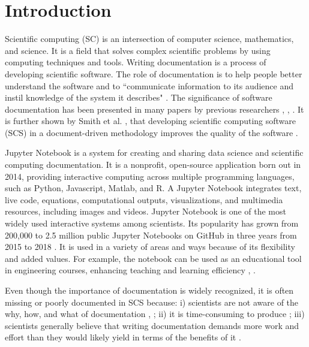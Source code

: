 \chapter{Introduction} \label{intro}
Scientific computing (SC) is an intersection of computer science, mathematics, 
and science. It is a field that solves complex scientific problems by using 
computing techniques and tools. Writing documentation is a process of 
developing scientific software. The role of documentation is to help 
people better understand the software and to ``communicate information to its 
audience and instil knowledge of the system it describes" 
\cite{forward2002software}. The significance of software documentation has 
been presented in many papers by previous researchers \cite{parnas2011precise}, 
\cite{chomal2014significance}, \cite{kipyegen2013importance}. It is further 
shown by Smith et al. \cite{SmithandKoothoor2016}, \cite{SmithandYu2007} that 
developing scientific computing software (SCS) in a document-driven methodology 
improves the quality of the software . 

Jupyter Notebook is a system for creating and sharing data science and 
scientific computing documentation. It is a nonprofit, open-source application 
born out in 2014, providing interactive computing across multiple programming 
languages, such as Python, Javascript, Matlab, and R. A Jupyter Notebook 
integrates text, live code, equations, computational outputs, visualizations, 
and multimedia resources, including images and videos. Jupyter Notebook is one 
of the most widely used interactive systems among scientists. Its popularity 
has grown from 200,000 to 2.5 million public Jupyter Notebooks on GitHub in 
three years from 2015 to 2018 \cite{Jeffrey2018}. It is used in a variety of 
areas and ways because of its flexibility and added values. For example, the 
notebook can be used as an educational tool in engineering courses, enhancing 
teaching and learning efficiency \cite{cardoso2019using}, \cite{zhao2019use}.

Even though the importance of documentation is widely recognized, it is often 
missing or poorly documented in SCS because: i) scientists are not aware of 
the why, how, and what of documentation \cite{hermann2022documenting}, 
\cite{chang2022understanding}; ii) it is time-consuming to produce 
\cite{sanders2008dealing}; iii) scientists generally believe that writing 
documentation demands more work and effort than they would likely yield in 
terms of the benefits of it \cite{smith2016advantages}.

